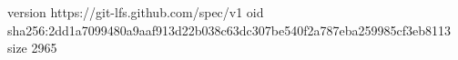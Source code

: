 version https://git-lfs.github.com/spec/v1
oid sha256:2dd1a7099480a9aaf913d22b038c63dc307be540f2a787eba259985cf3eb8113
size 2965
